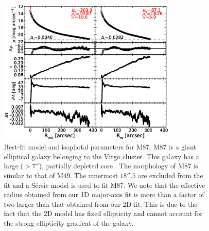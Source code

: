 \documentclass[preprint2]{emulateapj}
\newcommand{\fitfigurewidth}{0.8\textwidth}
\begin{document}
  \begin{figure}[h]
  \begin{center}
  \includegraphics[width=\fitfigurewidth]{images/m87_1Dfit.eps}
  \caption{Best-fit model and isophotal parameters for M87.
  M87 is a giant elliptical galaxy belonging to the Virgo cluster.
  This galaxy has a large ($> 7''$), partially depleted core \citep{ferrarese2006acsvcs}.
  The morphology of M87 is similar to that of M49.
  The innermost $18''.5$ are excluded from the fit and
  a S\'ersic model is used to fit M87. 
  We note that the effective radius obtained from our 1D major-axis fit is more than a factor of two larger than that obtained from our 2D fit.
  This is due to the fact that the 2D model has fixed ellipticity and cannot account for the strong ellipticity gradient of the galaxy.  
  }
  \end{center}
  \end{figure}
\end{document}
